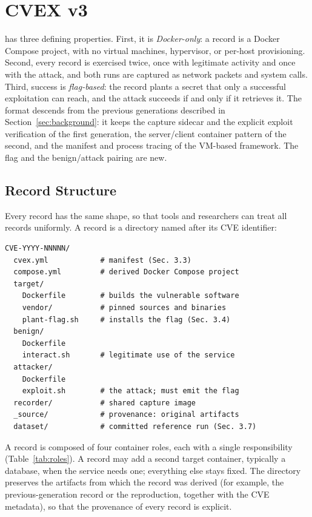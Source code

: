 \section{CVEX v3}
\label{sec:format}

\cvexthree has three defining properties. First, it is \emph{Docker-only}: a
record is a Docker Compose project, with no virtual machines, hypervisor, or
per-host provisioning. Second, every record is exercised twice, once with
legitimate activity and once with the attack, and both runs are captured as
network packets and system calls. Third, success is \emph{flag-based}: the
record plants a secret that only a successful exploitation can reach, and
the attack succeeds if and only if it retrieves it. The format descends from
the previous generations described in Section~\ref{sec:background}: it keeps
the capture sidecar and the explicit exploit verification of the first
generation, the server/client container pattern of the second, and the
 manifest and process tracing of the VM-based framework. The
flag and the benign/attack pairing are new.

\subsection{Record Structure}

Every record has the same shape, so that tools and researchers can treat all
records uniformly. A record is a directory named after its CVE identifier:

\begin{lstlisting}
CVE-YYYY-NNNNN/
  cvex.yml            # manifest (Sec. 3.3)
  compose.yml         # derived Docker Compose project
  target/
    Dockerfile        # builds the vulnerable software
    vendor/           # pinned sources and binaries
    plant-flag.sh     # installs the flag (Sec. 3.4)
  benign/
    Dockerfile
    interact.sh       # legitimate use of the service
  attacker/
    Dockerfile
    exploit.sh        # the attack; must emit the flag
  recorder/           # shared capture image
  _source/            # provenance: original artifacts
  dataset/            # committed reference run (Sec. 3.7)
\end{lstlisting}

A record is composed of four container roles, each with a single
responsibility (Table~\ref{tab:roles}). A record may add a second target
container, typically a database, when the service needs one; everything else
stays fixed. The  directory preserves the artifacts from which
the record was derived (for example, the previous-generation record or the
\genie reproduction, together with the CVE metadata), so that the provenance
of every record is explicit.

